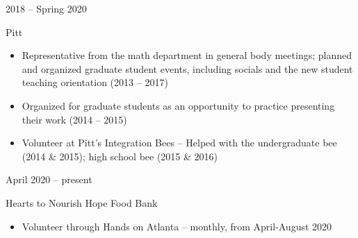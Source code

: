 \documentclass[a4paper,10pt]{article}
\newlength{\cvcolumngapwidth}
\newlength{\cvleftcolumnwidth}
\newlength{\cvrightcolumnwidth}
\newcommand{\cvtitlestyle}[1]{{\large\cvtitlefont\textcolor{cvtitlecolor}{#1}}}
\newcommand{\cvheadingstyle}[1]{{\normalsize\cvheadingfont\textcolor{cvheadingcolor}{#1}}}
\newlength{\cvafteritemskipamount}
\newlength{\cvaftertitleskipamount}
\newlength{\cvparskip}
\newcommand{\cvitem}[2]{
            \begin{minipage}[t]{\cvleftcolumnwidth}
                \raggedleft #1
            \end{minipage}%
            \hspace{\cvcolumngapwidth}%
            \begin{minipage}[t]{\cvrightcolumnwidth}
                \setlength{\parskip}{\cvparskip} #2
            \end{minipage}
        
            \vspace{\cvafteritemskipamount}
        }
\newcommand{\cvtitle}[1]{
            \cvtitlestyle{#1}
        
            \vspace{\cvaftertitleskipamount}
            \vspace{-\cvparskip}
        }
\begin{document}
        
            
        \cvitem{
            \cvheadingstyle{2018 -- Spring 2020}
        }{
            \cvtitle{Pitt}
        
            \begin{itemize}[leftmargin=*]
    	\item Representative from the math department in general body meetings; planned and organized graduate student events, including socials and the new student teaching orientation (2013 -- 2017)
    	\item Organized for graduate students as an opportunity to practice presenting their work (2014 -- 2015)
    	\item Volunteer at Pitt's Integration Bees -- Helped with the undergraduate bee (2014 \& 2015); high school bee (2015 \& 2016)
        
            \end{itemize}
        
        }
        
%        
        
        
          \cvitem{
            \cvheadingstyle{April 2020 -- present}
        }{
            \cvtitle{Hearts to Nourish Hope Food Bank}
        
            \begin{itemize}[leftmargin=*]
            	\item  Volunteer through Hands on Atlanta -- monthly, from April-August 2020
        
            \end{itemize}
        
        }
        
\end{document}
